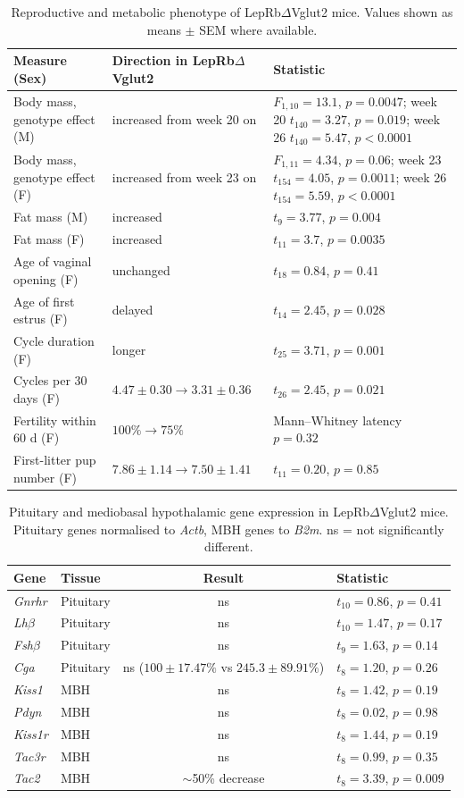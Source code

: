 \documentclass[11pt]{article}
\begin{document}
\begin{table}[htbp]
\centering
\caption{Reproductive and metabolic phenotype of LepRb$\Delta$Vglut2 mice. Values shown as means $\pm$ SEM where available.}
\label{tab:metabolic}
\begin{tabular}{p{4.2cm}lp{6.0cm}}
\toprule
Measure (Sex) & Direction in LepRb$\Delta$Vglut2 & Statistic \\
\midrule
Body mass, genotype effect (M) & increased from week 20 on & $F_{1,10}=13.1$, $p=0.0047$; week 20 $t_{140}=3.27$, $p=0.019$; week 26 $t_{140}=5.47$, $p<0.0001$ \\
Body mass, genotype effect (F) & increased from week 23 on & $F_{1,11}=4.34$, $p=0.06$; week 23 $t_{154}=4.05$, $p=0.0011$; week 26 $t_{154}=5.59$, $p<0.0001$ \\
Fat mass (M) & increased & $t_{9}=3.77$, $p=0.004$ \\
Fat mass (F) & increased & $t_{11}=3.7$, $p=0.0035$ \\
Age of vaginal opening (F) & unchanged & $t_{18}=0.84$, $p=0.41$ \\
Age of first estrus (F) & delayed & $t_{14}=2.45$, $p=0.028$ \\
Cycle duration (F) & longer & $t_{25}=3.71$, $p=0.001$ \\
Cycles per 30 days (F) & $4.47\pm0.30 \to 3.31\pm0.36$ & $t_{26}=2.45$, $p=0.021$ \\
Fertility within 60 d (F) & $100\% \to 75\%$ & Mann--Whitney latency $p=0.32$ \\
First-litter pup number (F) & $7.86\pm1.14 \to 7.50\pm1.41$ & $t_{11}=0.20$, $p=0.85$ \\
\bottomrule
\end{tabular}
\end{table}

\begin{table}[htbp]
\centering
\caption{Pituitary and mediobasal hypothalamic gene expression in LepRb$\Delta$Vglut2 mice. Pituitary genes normalised to \textit{Actb}, MBH genes to \textit{B2m}. ns = not significantly different.}
\label{tab:qpcr}
\begin{tabular}{llcl}
\toprule
Gene & Tissue & Result & Statistic \\
\midrule
\textit{Gnrhr} & Pituitary & ns & $t_{10}=0.86$, $p=0.41$ \\
\textit{Lh$\beta$} & Pituitary & ns & $t_{10}=1.47$, $p=0.17$ \\
\textit{Fsh$\beta$} & Pituitary & ns & $t_{9}=1.63$, $p=0.14$ \\
\textit{Cga} & Pituitary & ns ($100\pm17.47\%$ vs $245.3\pm89.91\%$) & $t_{8}=1.20$, $p=0.26$ \\
\textit{Kiss1} & MBH & ns & $t_{8}=1.42$, $p=0.19$ \\
\textit{Pdyn} & MBH & ns & $t_{8}=0.02$, $p=0.98$ \\
\textit{Kiss1r} & MBH & ns & $t_{8}=1.44$, $p=0.19$ \\
\textit{Tac3r} & MBH & ns & $t_{8}=0.99$, $p=0.35$ \\
\textit{Tac2} & MBH & $\sim$50\% decrease & $t_{8}=3.39$, $p=0.009$ \\
\bottomrule
\end{tabular}
\end{table}
\end{document}
